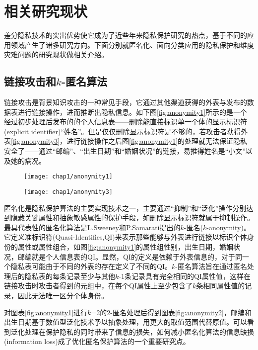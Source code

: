 \section{相关研究现状}
差分隐私技术的突出优势使它成为了近些年来隐私保护研究的热点，基于不同的应用领域产生了诸多研究方向。下面分别就匿名化、面向分类应用的隐私保护和维度灾难问题的研究现状做相关介绍。

\subsection{链接攻击和$k$-匿名算法}  %

链接攻击是背景知识攻击\cite{compounding attack}\cite{background attack}的一种常见手段，它通过其他渠道获得的外表与发布的数据表进行链接操作，进而推断出隐私信息。如下图\ref{fig:anonymity1}所示的是一个经过初步处理后发布的的个人信息表——删除能直接标识单一个体的显示标识符(explicit identifier)“姓名”。但是仅仅删除显示标识符是不够的，若攻击者获得外表\ref{fig:anonymity3}，进行链接操作之后图\ref{fig:anonymity1}的处理就无法保证隐私安全了——通过“邮编”、“出生日期”和“婚姻状况”的链接，易推得姓名是“小文”以及她的病况。

\begin{figure}[!htp]
	\centering
	\texttt{[image: chap1/anonymity1]}
\end{figure}

\begin{figure}[!htp]
	\centering
	\texttt{[image: chap1/anonymity3]}
\end{figure}


匿名化是隐私保护算法的主要实现技术之一，主要通过“抑制”和“泛化”操作分别达到隐藏关键属性和抽象敏感属性的保护手段，如删除显示标识符就属于抑制操作。最具代表性的匿名化算法是L.Sweeney和P.Samarati提出的$k$-匿名($k$-anonymity)\cite{k-anonymity}。它定义准标识符(Quasi-Identifies,QI)来表示那些能够与外表进行链接以标识个体身份的属性或属性组合，如图\ref{fig:anonymity1}的属性组{性别，出生日期，婚姻状况，邮编}就是个人信息表的QI。显然，QI的定义是依赖于外表信息的，对于同一个隐私表可能由于不同的外表的存在定义了不同的QI。$k$-匿名算法旨在通过匿名处理后的隐私表的每条记录至少与其他$k$-1条记录具有完全相同的QI属性值，这样在链接攻击时攻击者得到的元组中，在每个QI属性上至少包含了$k$条相同属性值的记录，因此无法唯一区分个体身份。

对图表\ref{fig:anonymity1}进行$k$=2的2-匿名处理后得到图表\ref{fig:anonymity2}，邮编和出生日期基于数值型泛化技术予以抽象处理，用更大的取值范围代替原值。可以看到泛化处理在保护隐私的同时带来了信息的损失，如何减小匿名化算法的信息缺损(information loss)\cite{Bottom-up generalization}\cite{Top-down specialization}成了优化匿名保护算法的一个重要研究点。

